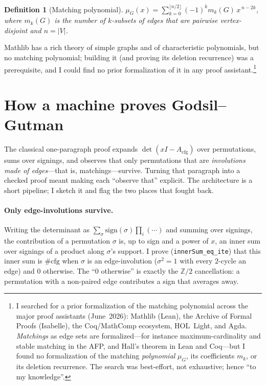 \documentclass[11pt]{article}
\newtheorem{definition}{Definition}
\newcommand{\lean}[1]{\texttt{#1}}
\newcommand{\Z}{\mathbb{Z}}
\begin{document}
\begin{definition}[Matching polynomial]
$\mu_G(x)=\sum_{k=0}^{\lfloor n/2\rfloor}(-1)^k m_k(G)\,x^{\,n-2k}$, where
$m_k(G)$ is the number of $k$-subsets of edges that are pairwise
vertex-disjoint and $n=|V|$.
\end{definition}

Mathlib has a rich theory of simple graphs and of characteristic polynomials,
but no matching polynomial; building it (and proving its deletion recurrence)
was a prerequisite, and I could find no prior formalization of it in any proof
assistant.\footnote{I searched for a prior formalization of the matching
polynomial across the major proof assistants (June~2026): Mathlib (Lean), the
Archive of Formal Proofs (Isabelle), the Coq/MathComp ecosystem, HOL~Light, and
Agda. \emph{Matchings} as edge sets are formalized---for instance
maximum-cardinality and stable matching in the AFP, and Hall's theorem in Lean
and Coq---but I found no formalization of the matching \emph{polynomial} $\mu_G$,
its coefficients $m_k$, or its deletion recurrence. The search was best-effort,
not exhaustive; hence ``to my knowledge''.}

\section{How a machine proves Godsil--Gutman}
\label{sec:gg}

The classical one-paragraph proof expands $\det(xI-A_{\mathrm{cfg}})$ over
permutations, sums over signings, and observes that only permutations that are
\emph{involutions made of edges}---that is, matchings---survive. Turning that
paragraph into a checked proof meant making each ``observe that'' explicit.
The architecture is a short pipeline; I sketch it and flag the two places that
fought back.

\paragraph{Only edge-involutions survive.}
Writing the determinant as $\sum_{\sigma}\mathrm{sign}(\sigma)\prod_i(\cdots)$
and summing over signings, the contribution of a permutation $\sigma$ is, up to
sign and a power of $x$, an inner sum over signings of a product along
$\sigma$'s support. I prove (\lean{innerSum\_eq\_ite}) that this inner sum is
$\#\mathrm{cfg}$ when $\sigma$ is an edge-involution ($\sigma^2=1$ with every
$2$-cycle an edge) and $0$ otherwise. The ``$0$ otherwise'' is exactly the
$\Z/2$ cancellation: a permutation with a non-paired edge contributes a sign
that averages away.
\end{document}
